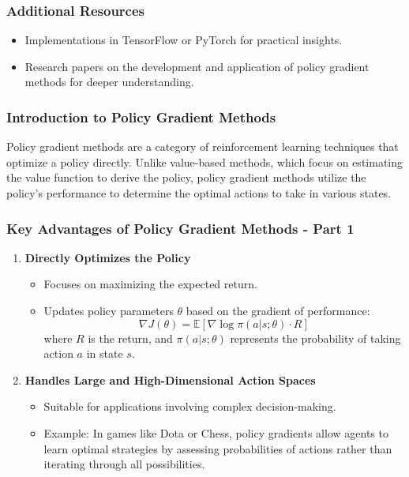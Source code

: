 \documentclass[aspectratio=169]{beamer}
\begin{document}
\begin{frame}[fragile]
    \frametitle{Additional Resources}
    \begin{itemize}
        \item Implementations in TensorFlow or PyTorch for practical insights.
        \item Research papers on the development and application of policy gradient methods for deeper understanding.
    \end{itemize}
\end{frame}

\begin{frame}
    \titlepage
\end{frame}

\begin{frame}[fragile]
    \frametitle{Introduction to Policy Gradient Methods}
    Policy gradient methods are a category of reinforcement learning techniques that optimize a policy directly. Unlike value-based methods, which focus on estimating the value function to derive the policy, policy gradient methods utilize the policy's performance to determine the optimal actions to take in various states.
\end{frame}

\begin{frame}[fragile]
    \frametitle{Key Advantages of Policy Gradient Methods - Part 1}
    \begin{enumerate}
        \item \textbf{Directly Optimizes the Policy}
        \begin{itemize}
            \item Focuses on maximizing the expected return.
            \item Updates policy parameters $\theta$ based on the gradient of performance:
            \begin{equation}
            \nabla J(\theta) = \mathbb{E}[\nabla \log \pi(a|s; \theta) \cdot R]
            \end{equation}
            where $R$ is the return, and $\pi(a|s; \theta)$ represents the probability of taking action $a$ in state $s$.
        \end{itemize}
        
        \item \textbf{Handles Large and High-Dimensional Action Spaces}
        \begin{itemize}
            \item Suitable for applications involving complex decision-making.
            \item Example: In games like Dota or Chess, policy gradients allow agents to learn optimal strategies by assessing probabilities of actions rather than iterating through all possibilities.
        \end{itemize}
    \end{enumerate}
\end{frame}
\end{document}
